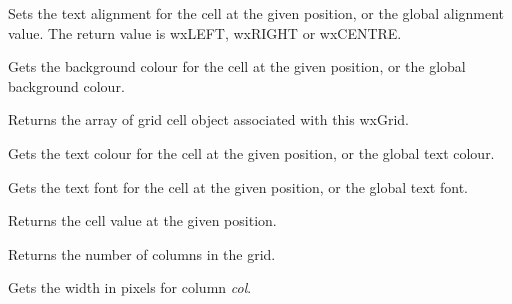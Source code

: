 Sets the text alignment for the cell at the given position, or the global alignment value.
The return value is wxLEFT, wxRIGHT or wxCENTRE.

\label{wxgridgetcellbackgroundcolour}



Gets the background colour for the cell at the given position, or the global background colour.

\label{wxgridgetcells}


Returns the array of grid cell object associated with this wxGrid.

\label{wxgridgetcelltextcolour}



Gets the text colour for the cell at the given position, or the global text colour.

\label{wxgridgetcelltextfont}



Gets the text font for the cell at the given position, or the global text font.

\label{wxgridgetcellvalue}


Returns the cell value at the given position.

\label{wxgridgetcols}


Returns the number of columns in the grid.

\label{wxgridcolumnwidth}


Gets the width in pixels for column {\it col}.


